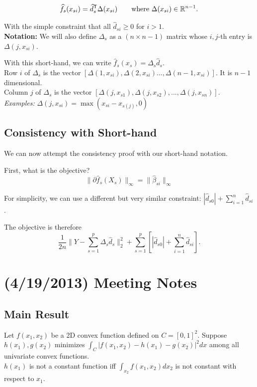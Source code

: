 \documentclass{article}
\begin{document}
\[
\widehat{f}_s(x_{si}) = \widehat{d}_{s}^{\mathsf{T}} \Delta(x_{si}) \qquad \textrm{where $\Delta(x_{si}) \in \mathbb{R}^{n-1}$.}
\]

With the simple constraint that all $\hat{d}_{si} \geq 0$ for $i > 1$.\\

\textbf{Notation:} We will also define $\Delta_s$ as a $(n \times n-1)$ matrix whose $i,j$-th entry is $\Delta(j, x_{si})$. 

With this short-hand, we can write $\hat{f}_s(x_s) = \Delta_s\hat{d}_s$.\\

Row $i$ of $\Delta_s$ is the vector $[ \Delta(1, x_{si}), \Delta(2,x_{si}) ..., \Delta(n-1, x_{si})]$. It is $n-1$ dimensional.\\

Column $j$ of $\Delta_s$ is the vector $[ \Delta(j, x_{s1}), \Delta(j, x_{s2}), ..., \Delta(j, x_{sn}) ]$. \\

\emph{Examples:} $\Delta(j, x_{si}) = \max(x_{si} - x_{s(j)}, 0)$

\subsection{Consistency with Short-hand}

We can now attempt the consistency proof with our short-hand notation.

First, what is the objective? 
\[
\| \partial \hat{f}_s(X_s) \|_\infty = \| \hat{\beta}_{si} \|_\infty 
\]

For simplicity, we can use a different but very similar constraint: $ |\hat{d}_{s0}| + \sum_{i=1}^n \hat{d}_{si}$.

The objective is therefore
\[
\frac{1}{2n} \| Y - \sum_{s=1}^p \Delta_s \hat{d}_s \|_2^2 + \sum_{s=1}^p \left[ |\hat{d}_{s0}| + \sum_{i=1}^n \hat{d}_{si} \right].
\]


\section{(4/19/2013) Meeting Notes}
\subsection{Main Result}

\begin{lemma}
\label{lem:int_reduction}
Let $f(x_1, x_2)$ be a 2D convex function defined on $C = [0,1]^2$. Suppose $h(x_1), g(x_2)$ minimizes $ \int_C | f (x_1, x_2) - h(x_1) - g(x_2) |^2 dx$ among all univariate convex functions.\\

$h(x_1)$ is not a constant function iff $\int_{x_2} f(x_1,x_2) dx_2$ is not constant with respect to $x_1$.
\end{lemma}
\end{document}
